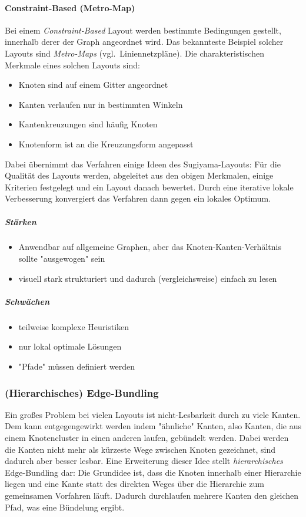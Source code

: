 				\paragraph{Constraint-Based (Metro-Map)}
					Bei einem \emph{Constraint-Based} Layout werden bestimmte Bedingungen gestellt, innerhalb derer der Graph angeordnet wird. Das bekannteste Beispiel solcher Layouts sind \emph{Metro-Maps} (vgl.~Liniennetzpläne). Die charakteristischen Merkmale eines solchen Layouts sind:
					\begin{itemize}
						\item Knoten sind auf einem Gitter angeordnet
						\item Kanten verlaufen nur in bestimmten Winkeln
						\item Kantenkreuzungen sind häufig Knoten
						\item Knotenform ist an die Kreuzungsform angepasst
					\end{itemize}
					Dabei übernimmt das Verfahren einige Ideen des Sugiyama-Layouts: Für die Qualität des Layouts werden, abgeleitet aus den obigen Merkmalen, einige Kriterien festgelegt und ein Layout danach bewertet. Durch eine iterative lokale Verbesserung konvergiert das Verfahren dann gegen ein lokales Optimum.

					\subparagraph{Stärken}
					\begin{itemize}
						\item Anwendbar auf allgemeine Graphen, aber das Knoten-Kanten-Verhältnis sollte "ausgewogen" sein
						\item visuell stark strukturiert und dadurch (vergleichsweise) einfach zu lesen
					\end{itemize}

					\subparagraph{Schwächen}
					\begin{itemize}
						\item teilweise komplexe Heuristiken
						\item nur lokal optimale Lösungen
						\item "Pfade" müssen \ggf definiert werden
					\end{itemize}

			\subsubsection{(Hierarchisches) Edge-Bundling}
				Ein großes Problem bei vielen Layouts ist nicht-Lesbarkeit durch zu viele Kanten. Dem kann entgegengewirkt werden indem "ähnliche" Kanten, also Kanten, die aus einem Knotencluster in einen anderen laufen, gebündelt werden. Dabei werden die Kanten nicht mehr als kürzeste Wege zwischen Knoten gezeichnet, sind dadurch aber besser lesbar. Eine Erweiterung dieser Idee stellt \emph{hierarchisches} Edge-Bundling dar: Die Grundidee ist, dass die Knoten innerhalb einer Hierarchie liegen und eine Kante statt des direkten Weges über die Hierarchie zum gemeinsamen Vorfahren läuft. Dadurch durchlaufen mehrere Kanten den gleichen Pfad, was eine Bündelung ergibt.

